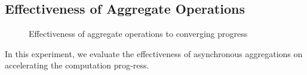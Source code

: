 \begin{appendix}
 \subsection{Effectiveness of Aggregate Operations}
 \label{sec:expr:aggregations}

 \begin{figure}[!t]
 \vspace{-0.1in}
 \centerline{
 \hspace{-5mm}
 }
 \vspace{-0.1in}
 \caption{Effectiveness of aggregate operations to converging progress}
 \label{fig:single-numagg}
 \vspace{-0.1in}
 \end{figure}
In this experiment, we evaluate the effectiveness of asynchronous aggregations on accelerating the computation prog-ress.
 

\end{appendix}
